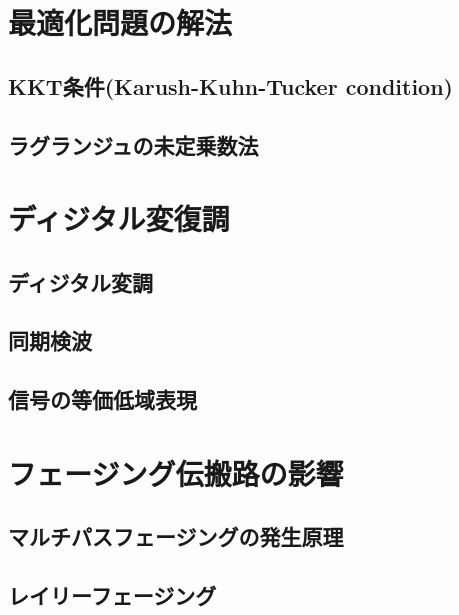 \section{最適化問題の解法}
\subsection{KKT条件(Karush-Kuhn-Tucker condition)}
\subsection{ラグランジュの未定乗数法}

\section{ディジタル変復調}
\subsection{ディジタル変調}
\subsection{同期検波}
\subsection{信号の等価低域表現}

\section{フェージング伝搬路の影響}
\subsection{マルチパスフェージングの発生原理}
\subsection{レイリーフェージング}
